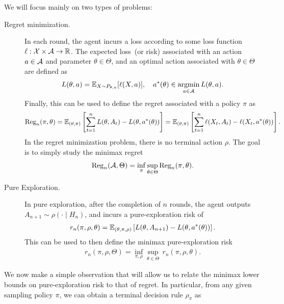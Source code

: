 \documentclass[12pt]{article}
\begin{document}
\vspace{1em}
We will focus mainly on two types of problems: 
\begin{description}
	\item[Regret minimization.] 
	 In each round, the agent incurs a loss according to some loss function $\ell: {\cal X} \times {\cal A} \to \mathbb{R}$. The expected loss~(or risk) associated with an action $a \in {\cal A}$ and parameter $\theta \in \Theta$, and an optimal action associated with $\theta \in \Theta$ are defined as 
	\begin{align}
		L(\theta, a) = \mathbb{E}_{X \sim P_{\theta, a}}[\ell(X, a)], \quad a^*(\theta) \in \operatorname*{argmin}_{a \in {\cal A}} L(\theta, a). 
	\end{align}
	Finally, this can be used to define the regret associated with a policy $\pi$ as 
	\begin{align}
	\mathrm{Reg}_n(\pi, \theta) = \mathbb{E}_{(\theta, \pi)} \left[ \sum_{t=1}^n L(\theta, A_t)  - L(\theta, a^*(\theta))\right] =  \mathbb{E}_{(\theta, \pi)} \left[ \sum_{t=1}^n \ell(X_t, A_t) - \ell(X_t, a^*(\theta)) \right]. 
	\end{align}
	In the regret minimization problem, there is no terminal action $\rho$. The goal is to simply study the minimax regret 
	\begin{align}
	\mathrm{Reg}_n({\cal A}, \Theta) = \inf_{\pi} \sup_{\theta \in \Theta} \mathrm{Reg}_n(\pi, \theta).  \label{eq:minimax-regret}
	\end{align} 

	\item[Pure Exploration.] In pure exploration, after the completion of $n$ rounds, the agent outputs $A_{n+1} \sim \rho(\cdot \mid H_n)$, and incurs a pure-exploration risk of 
	\begin{align}
		r_n(\pi, \rho,  \theta) = \mathbb{E}_{(\theta, \pi, \rho)}\left[ L(\theta, A_{n+1}) - L(\theta, a^*(\theta)) \right]. 
	\end{align} 
	This can be used to then define the minimax pure-exploration risk 
	\begin{align}
	r_n(\pi, \rho, \Theta) = \inf_{\pi, \rho} \sup_{\theta \in \Theta} \, r_n(\pi, \rho, \theta). \label{eq:minimax-pure-exploration-risk}
	\end{align}
\end{description}
We now make a simple observation that will allow us to relate the minimax lower bounds on pure-exploration risk to that of regret. In particular, from any given sampling policy $\pi$, we can obtain a terminal decision rule $\rho_\pi$ as 
\end{document}
